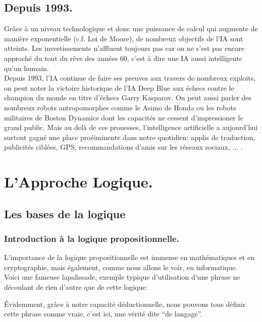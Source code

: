 \documentclass[a4paper, 12pt]{article}
\numberwithin{equation}{subsection}
\begin{document}
\subsection{Depuis 1993.}
Grâce à un niveau technologique et donc une puissance de calcul qui augmente de manière exponentielle (c.f. Loi de Moore), de nombreux objectifs de l'IA sont atteints. Les investissements n'affluent toujours pas car on ne s'est pas encore approché du tout du rêve des années 60, c'est à dire une IA aussi intelligente qu'un humain.\\

Depuis 1993, l'IA continue de faire ses preuves aux travers de nombreux exploits, on peut noter la victoire historique de l'IA Deep Blue aux échecs contre le champion du monde en titre d'échecs Garry Kasparov. On peut aussi parler des nombreux robots antropomorphes comme le Asimo de Honda ou les robots militaires de Boston Dynamics dont les capacités ne cessent d'impressioner le grand public. Mais au delà de ces prouesses, l'intelligence artificielle a aujourd'hui surtout gagné une place proéiminente dans notre quotidien: applis de traduction, publicités ciblées, GPS, recommandations d'amis sur les réseaux sociaux, ... .

\section{L'Approche Logique.}
\subsection{Les bases de la logique}
  \subsubsection{Introduction à la logique propositionnelle.}
     L'importance de la logique propositionnelle est immense en mathématiques et en cryptographie, mais également, comme nous allons le voir, en informatique.\\
     Voici une fameuse lapalissade, exemple typique d'utilisation d'une phrase ne découlant de rien d'autre que de cette logique:
  \begin{center}
     
  \end{center}
     Évidemment, grâce à notre capacité déductionnelle, nous pouvons tous définir cette phrase comme vraie, c'est ici, une vérité dite ``de  langage''. \\[0.5cm]
\end{document}
